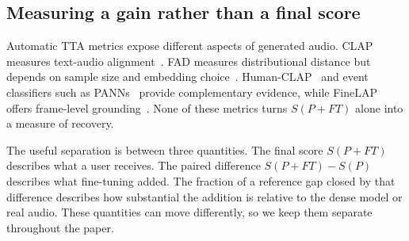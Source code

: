 \documentclass{article}
\newcommand{\PFT}{P{+}FT}
\begin{document}
\subsection{Measuring a gain rather than a final score}
Automatic TTA metrics expose different aspects of generated audio. CLAP measures text-audio alignment~\cite{wu2023clap}. FAD measures distributional distance but depends on sample size and embedding choice~\cite{kilgour2019fad,gui2024fad,chung2025kad}. Human-CLAP~\cite{takano2025humanclap} and event classifiers such as PANNs~\cite{kong2020panns} provide complementary evidence, while FineLAP offers frame-level grounding~\cite{li2026finelap}. None of these metrics turns $S(\PFT)$ alone into a measure of recovery.

The useful separation is between three quantities. The final score $S(\PFT)$ describes what a user receives. The paired difference $S(\PFT)-S(P)$ describes what fine-tuning added. The fraction of a reference gap closed by that difference describes how substantial the addition is relative to the dense model or real audio. These quantities can move differently, so we keep them separate throughout the paper.
\end{document}
